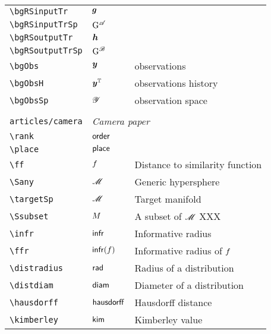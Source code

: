 \begin{longtable}{lll}
 {\color[rgb]{0.5,0.5,0.5}\texttt{\textbackslash bgRSinputTr}} & $\boldsymbol{g}$ &  \\ 
 {\color[rgb]{0.5,0.5,0.5}\texttt{\textbackslash bgRSinputTrSp}} & $\mathrm{G}^{\mathscr{A}}$ &  \\ 
 {\color[rgb]{0.5,0.5,0.5}\texttt{\textbackslash bgRSoutputTr}} & $\boldsymbol{h}$ &  \\ 
 {\color[rgb]{0.5,0.5,0.5}\texttt{\textbackslash bgRSoutputTrSp}} & $\mathrm{G}^{\mathscr{B}}$ & \\ 
 {\color[rgb]{0.5,0.5,0.5}\texttt{\textbackslash bgObs}} & $\boldsymbol{y}$ &  observations\\ 
 {\color[rgb]{0.5,0.5,0.5}\texttt{\textbackslash bgObsH}} & $\boldsymbol{y}^{\mathbb{T}}$ &  observations history\\ 
 {\color[rgb]{0.5,0.5,0.5}\texttt{\textbackslash bgObsSp}} & $\mathscr{Y}$ &  observation space\\ 
  &  & \\ 
 {\color[rgb]{0.5,0.5,0.5}\texttt{articles/camera}} & \multicolumn{2}{l}{\emph{Camera paper}}\\ 
 \hline
{\color[rgb]{0.5,0.5,0.5}\texttt{\textbackslash rank}} & $\mathsf{order}$ & \\ 
 {\color[rgb]{0.5,0.5,0.5}\texttt{\textbackslash place}} & $\mathsf{place}$ & \\ 
 {\color[rgb]{0.5,0.5,0.5}\texttt{\textbackslash ff}} & $f$ &  Distance to similarity function\\ 
 {\color[rgb]{0.5,0.5,0.5}\texttt{\textbackslash Sany}} & $\mathscr{M}$ &  Generic hypersphere\\ 
 {\color[rgb]{0.5,0.5,0.5}\texttt{\textbackslash targetSp}} & $\mathscr{M}$ &  Target manifold\\ 
 {\color[rgb]{0.5,0.5,0.5}\texttt{\textbackslash Ssubset}} & $M$ &  A subset of $\mathscr{M}$  XXX\\ 
 {\color[rgb]{0.5,0.5,0.5}\texttt{\textbackslash infr}} & $\mathsf{infr}$ &  Informative radius\\ 
 {\color[rgb]{0.5,0.5,0.5}\texttt{\textbackslash ffr}} & $\mathsf{infr}(f)$ &  Informative radius of $f$\\ 
 {\color[rgb]{0.5,0.5,0.5}\texttt{\textbackslash distradius}} & $\mathsf{rad}$ &  Radius of a distribution\\ 
 {\color[rgb]{0.5,0.5,0.5}\texttt{\textbackslash distdiam}} & $\mathsf{diam}$ &  Diameter of a distribution\\ 
 {\color[rgb]{0.5,0.5,0.5}\texttt{\textbackslash hausdorff}} & $\mathsf{hausdorff}$ &  Hausdorff distance\\ 
 {\color[rgb]{0.5,0.5,0.5}\texttt{\textbackslash kimberley}} & $\mathsf{kim}$ &  Kimberley value\\ 

\end{longtable}
